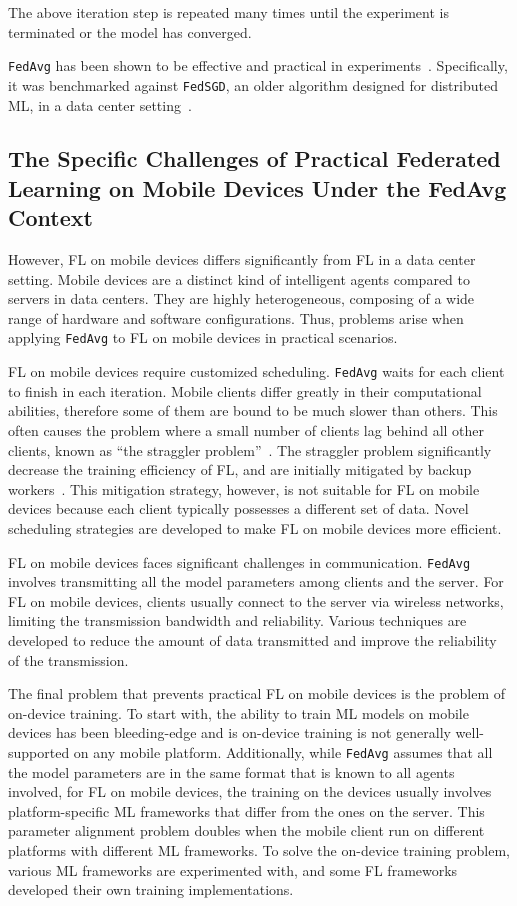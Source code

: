 \documentclass[conference]{IEEEtran}
\begin{document}
The above iteration step is repeated many times until
the experiment is terminated or
the model has converged.

\verb|FedAvg| has been shown to be effective and practical
in experiments~\cite{mcmahan2017communication}.
Specifically, it was benchmarked against \verb|FedSGD|\cite{chen2016revisiting},
an older algorithm designed for distributed ML,
in a data center setting~\cite{bonawitz2019towards}.

\subsection{The Specific Challenges of Practical Federated Learning on
Mobile Devices Under the FedAvg Context}

However, FL on mobile devices differs significantly from
FL in a data center setting.
Mobile devices are a distinct kind of intelligent agents compared to
servers in data centers.
They are highly heterogeneous,
composing of a wide range of hardware and software configurations.
Thus, problems arise when applying \verb|FedAvg| to FL on mobile devices in
practical scenarios.

FL on mobile devices require customized scheduling.
\verb|FedAvg| waits for each client to finish in each iteration.
Mobile clients differ greatly in their computational abilities,
therefore some of them are bound to be much slower than others.
This often causes the problem where
a small number of clients lag behind all other clients,
known as
``the straggler problem''~\cite{chen2020asynchronous,zheng2017asynchronous}.
The straggler problem significantly decrease the training efficiency of FL,
and are initially mitigated by backup workers~\cite{chen2016revisiting}.
This mitigation strategy, however,
is not suitable for FL on mobile devices because
each client typically possesses a different set of data.
Novel scheduling strategies are developed to
make FL on mobile devices more efficient.

FL on mobile devices faces significant challenges in communication.
\verb|FedAvg| involves transmitting all the model parameters among
clients and the server.
For FL on mobile devices,
clients usually connect to the server via wireless networks,
limiting the transmission bandwidth and reliability.
Various techniques are developed to reduce the amount of data transmitted
and improve the reliability of the transmission.

The final problem that prevents practical FL on mobile devices is
the problem of on-device training.
To start with, the ability to train ML models on mobile devices has been
bleeding-edge and
is on-device training is not generally well-supported on any mobile platform.
Additionally,
while \verb|FedAvg| assumes that all the model parameters are
in the same format that is known to all agents involved,
for FL on mobile devices,
the training on the devices usually involves platform-specific ML frameworks
that differ from the ones on the server.
This parameter alignment problem doubles when
the mobile client run on different platforms with
different ML frameworks.
To solve the on-device training problem,
various ML frameworks are experimented with,
and some FL frameworks developed their own training implementations.
\end{document}
